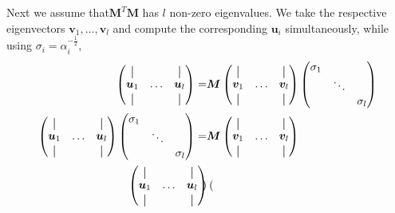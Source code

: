 Next we assume that$\bm{M}^T \bm{M}$ has $l$  non-zero eigenvalues.
We take the respective eigenvectors $\bm{v}_1, \hdots, \bm{v}_l$  and compute the corresponding $\bm{u}_i$ 
simultaneously, while using $\sigma_i=\alpha_i^{-\frac{1}{2}}$,
\begin{align}
    \begin{pmatrix}
    \vertbar &        & \vertbar \\
    \bm{u}_1 & \hdots & \bm{u}_l \\
    \vertbar &        & \vertbar 
    \end{pmatrix} =&
    \bm{M}
    \begin{pmatrix}
    \vertbar &        & \vertbar \\
    \bm{v}_1 & \hdots & \bm{v}_l \\
    \vertbar &        & \vertbar 
    \end{pmatrix}
    \begin{pmatrix}
    \sigma_1 &        &          \\
             & \ddots &          \\ 
             &        & \sigma_l
    \end{pmatrix} \\
    \begin{pmatrix}
    \vertbar &        & \vertbar \\
    \bm{u}_1 & \hdots & \bm{u}_l \\
    \vertbar &        & \vertbar 
    \end{pmatrix}
    \begin{pmatrix}
        \sigma_1 &        &          \\
                 & \ddots &          \\ 
                 &        & \sigma_l
        \end{pmatrix}
    =&
    \bm{M}
    \begin{pmatrix}
    \vertbar &        & \vertbar \\
    \bm{v}_1 & \hdots & \bm{v}_l \\
    \vertbar &        & \vertbar 
    \end{pmatrix} \\
    \begin{pmatrix}
    \vertbar &        & \vertbar \\
    \bm{u}_1 & \hdots & \bm{u}_l \\
    \vertbar &        & \vertbar 
    \end{pmatrix}
    \begin{pmatrix}

\end{pmatrix}
\end{align}
